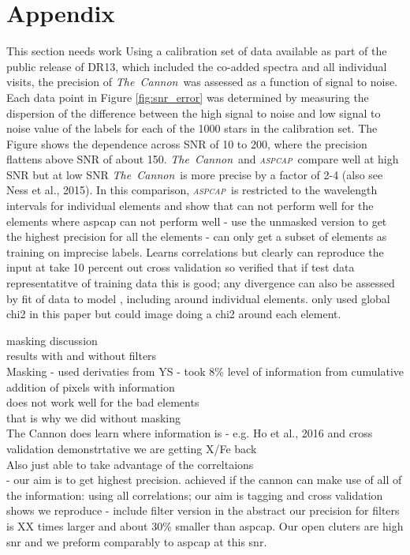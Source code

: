 \documentclass[14pt, preprint2]{aastex6}
\newcommand{\project}[1]{\textsl{#1}}
\newcommand{\tc}{\project{The~Cannon}}
\newcommand{\aspcap}{\project{\textsc{aspcap}}}
\begin{document}
\section{Appendix}
This section needs work 
Using a calibration set of data available as part of the public release of DR13, which included the co-added spectra and all individual visits, the precision of \tc\ was assessed as a function of signal to noise. Each data point in Figure \ref{fig:snr_error} was determined by measuring the dispersion of the difference between the high signal to noise and low signal to noise value of the labels for each of the 1000 stars in the calibration set. The Figure shows the dependence across SNR of 10 to 200, where the precision flattens above SNR of about 150. \tc\ and \aspcap\ compare well at high SNR but at low SNR \tc\ is more precise by a factor of 2-4 (also see Ness et al., 2015). In this comparison, \aspcap\ is restricted to the wavelength intervals for individual elements and show that can not perform well for the elements where aspcap can not perform well - use the unmasked version to get the highest precision for all the elements - can only get a subset of elements as training on imprecise labels. Learns correlations but clearly can reproduce the input at take 10 percent out cross validation so verified that if test data representatitve of training data this is good; any divergence can also be assessed by fit of data to model , including around individual elements. only used global chi2 in this paper but could image doing a chi2 around each element. 


masking discussion \\
results with and without filters\\
Masking - used derivaties from YS - took 8\% level of information from cumulative addition of pixels with information \\
does not work well for the bad elements \\
that is why we did without masking \\
The Cannon does learn where information is - e.g. Ho et al., 2016 and cross validation demonstrtative we are getting X/Fe back \\
Also just able to take advantage of the correltaions \\
- our aim is to get highest precision. achieved if the cannon can make use of all of the information: using all correlations; our aim is tagging and cross validation shows we reproduce - include filter version in the abstract
our precision for filters is XX times larger and about 30\% smaller than aspcap. Our open cluters are high snr and we preform comparably to aspcap at this snr. 
\end{document}
